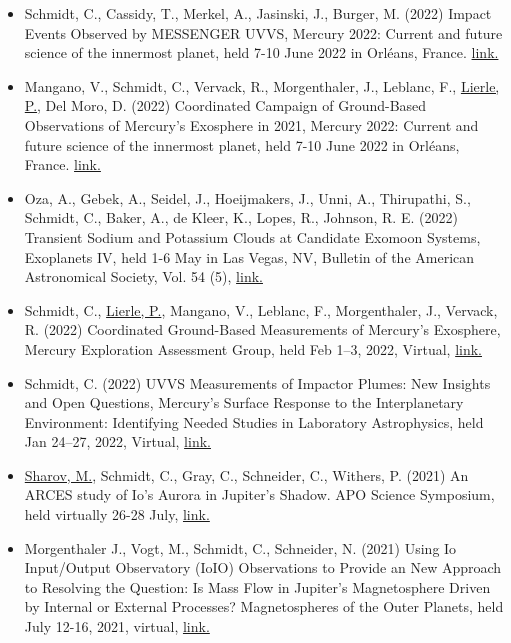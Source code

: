 \documentclass[12pt]{report}
\begin{document}
\begin{itemize}
   \item Schmidt, C., Cassidy, T., Merkel, A., Jasinski, J., Burger, M. (2022) Impact Events Observed by MESSENGER UVVS, Mercury 2022: Current and future science of the innermost planet, held 7-10 June 2022 in Orl\'eans, France. \href{https://mercury2020.ias.u-psud.fr/main_1st.php}{link.} 
   \item Mangano, V., Schmidt, C., Vervack, R., Morgenthaler, J., Leblanc, F., \underline{Lierle, P.}, Del Moro, D. (2022) Coordinated Campaign of Ground-Based Observations of Mercury’s Exosphere in 2021, Mercury 2022: Current and future science of the innermost planet, held 7-10 June 2022 in Orl\'eans, France. \href{https://mercury2020.ias.u-psud.fr/main_1st.php}{link.} 
   \item Oza, A., Gebek, A., Seidel, J., Hoeijmakers, J., Unni, A., Thirupathi, S., Schmidt, C., Baker, A., de Kleer, K., Lopes, R., Johnson, R.  E. (2022) Transient Sodium and Potassium Clouds at Candidate Exomoon Systems, Exoplanets IV, held 1-6 May in Las Vegas, NV, Bulletin of the American Astronomical Society, Vol. 54 (5), \href{https://baas.aas.org/pub/2022n5i208p02}{link.} 
   \item Schmidt, C., \underline{Lierle, P.}, Mangano, V., Leblanc, F., Morgenthaler, J., Vervack, R. (2022) Coordinated Ground-Based Measurements of Mercury’s Exosphere, Mercury Exploration Assessment Group, held Feb 1–3, 2022, Virtual, \href{https://www.hou.usra.edu/meetings/mexagfebruary2022/eposter/9007.pdf}{link.} 
   \item Schmidt, C. (2022) UVVS Measurements of Impactor Plumes: New Insights and Open Questions, Mercury’s Surface Response to the Interplanetary Environment: Identifying Needed Studies in Laboratory Astrophysics, held Jan 24–27, 2022, Virtual, \href{https://meeting.psi.edu/mercurylab2022/}{link.} 
   \item \underline{Sharov, M.}, Schmidt, C., Gray, C., Schneider, C., Withers, P. (2021) An ARCES study of Io's Aurora in Jupiter’s Shadow. APO Science Symposium, held virtually 26-28 July, \href{ http://astronomy.nmsu.edu/aposcisymposium21/}{link.} 
   \item Morgenthaler J., Vogt, M., Schmidt, C., Schneider, N. (2021) Using Io Input/Output Observatory (IoIO) Observations to Provide an New Approach to Resolving the Question: Is Mass Flow in Jupiter's Magnetosphere Driven by Internal or External Processes? Magnetospheres of the Outer Planets, held July 12-16, 2021, virtual, \href{https://www.mop.uliege.be/upload/docs/application/pdf/2021-06/mop21_conference_booklet.pdf}{link.} 

\end{itemize}
\end{document}
